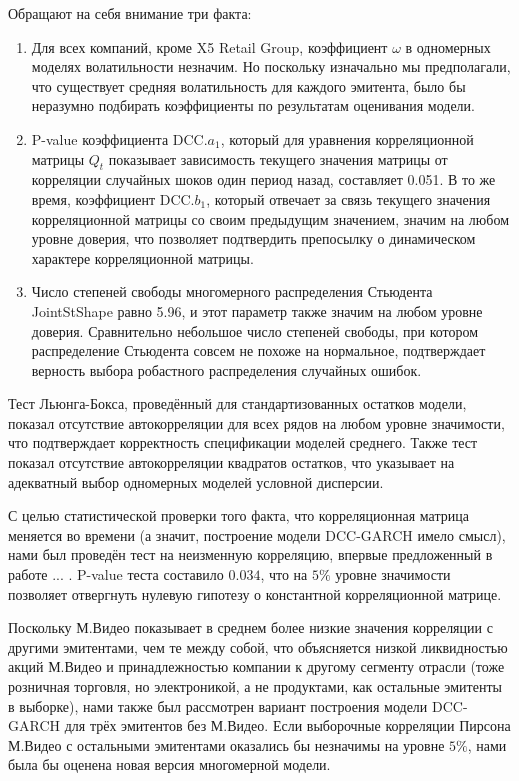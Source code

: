 \documentclass[a4paper,11pt]{article}
\begin{document}
Обращают на себя внимание три факта:
\begin{enumerate}
    \item Для всех компаний, кроме X5 Retail Group, коэффициент $\omega$ в одномерных моделях волатильности незначим. Но поскольку изначально мы предполагали, что существует средняя волатильность для каждого эмитента, было бы неразумно подбирать коэффициенты по результатам оценивания модели. 
    \item P-value коэффициента DCC.$a_1$, который для уравнения корреляционной матрицы $Q_t$ показывает зависимость текущего значения матрицы от корреляции случайных шоков один период назад, составляет 0.051. В то же время, коэффициент DCC.$b_1$, который отвечает за связь текущего значения корреляционной матрицы со своим предыдущим значением, значим на любом уровне доверия, что позволяет подтвердить препосылку о динамическом характере корреляционной матрицы.
    \item Число степеней свободы многомерного распределения Стьюдента JointStShape равно 5.96, и этот параметр также значим на любом уровне доверия. Сравнительно небольшое число степеней свободы, при котором распределение Стьюдента совсем не похоже на нормальное, подтверждает верность выбора робастного распределения случайных ошибок.
\end{enumerate}

Тест Льюнга-Бокса, проведённый для стандартизованных остатков модели, показал отсутствие автокорреляции для всех рядов на любом уровне значимости, что подтверждает корректность спецификации моделей среднего. Также тест показал отсутствие автокорреляции квадратов остатков, что указывает на адекватный выбор одномерных моделей условной дисперсии.

С целью статистической проверки того факта, что корреляционная матрица меняется во времени (а значит, построение модели DCC-GARCH имело смысл), нами был проведён тест на неизменную корреляцию, впервые предложенный в работе ... . P-value теста составило $0.034$, что на $5\%$ уровне значимости позволяет отвергнуть нулевую гипотезу о константной корреляционной матрице.

Поскольку М.Видео показывает в среднем более низкие значения корреляции с другими эмитентами, чем те между собой, что объясняется низкой ликвидностью акций М.Видео и принадлежностью компании к другому сегменту отрасли (тоже розничная торговля, но электроникой, а не продуктами, как остальные эмитенты в выборке), нами также был рассмотрен вариант построения модели DCC-GARCH для трёх эмитентов без М.Видео. Если выборочные корреляции Пирсона М.Видео с остальными эмитентами оказались бы незначимы на уровне $5\%$, нами была бы оценена новая версия многомерной модели.
\end{document}
